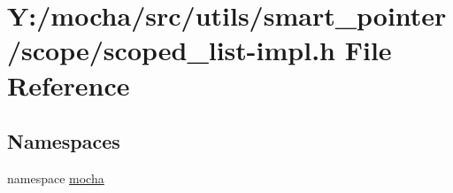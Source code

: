 \hypertarget{scoped__list-impl_8h}{
\section{Y:/mocha/src/utils/smart\_\-pointer/scope/scoped\_\-list-\/impl.h File Reference}
\label{scoped__list-impl_8h}
}
\subsection*{Namespaces}
\begin{DoxyCompactItemize}
\item 
namespace \hyperlink{namespacemocha}{mocha}
\end{DoxyCompactItemize}
